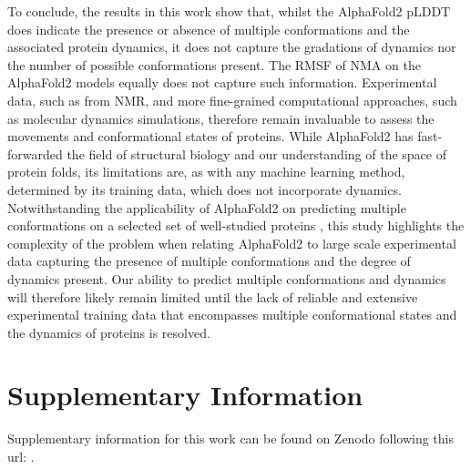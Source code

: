 To conclude, the results in this work show that, whilst the AlphaFold2 pLDDT does indicate the presence or absence of multiple conformations and the associated protein dynamics, it does not capture the gradations of dynamics nor the number of possible conformations present. The RMSF of NMA on the AlphaFold2 models equally does not capture such information. Experimental data, such as from NMR, and more fine-grained computational approaches, such as molecular dynamics simulations, therefore remain invaluable to assess the movements and conformational states of proteins. While AlphaFold2 has fast-forwarded the field of structural biology and our understanding of the space of protein folds,  its limitations are, as with any machine learning method, determined by its training data, which does not incorporate dynamics. Notwithstanding the applicability of AlphaFold2 on predicting multiple conformations on a selected set of well-studied proteins \cite{wayment-steele_predicting_2023}, this study highlights the complexity of the problem when relating AlphaFold2 to large scale experimental data capturing the presence of multiple conformations and the degree of dynamics present. Our ability to predict multiple conformations and dynamics will therefore likely remain limited until the lack of reliable and extensive experimental training data that encompasses multiple conformational states and the dynamics of proteins is resolved.

\section*{Supplementary Information}
Supplementary information for this work can be found on Zenodo following this url: .



